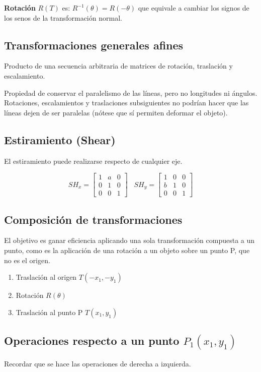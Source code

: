 \textbf{Rotación} $R(T)$ es: $R^{-1}(\theta) = R(-\theta)$ que equivale a cambiar los signos de los senos de la transformación normal.

\subsection{Transformaciones generales afines}
Producto de una secuencia arbitraria de matrices de rotación, traslación y escalamiento.

Propiedad de conservar el paralelismo de las líneas, pero no longitudes ni ángulos. Rotaciones, escalamientos y traslaciones subsiguientes no podrían hacer que las líneas dejen de ser paralelas (nótese que sí permiten deformar el objeto).

\subsection{Estiramiento (Shear)}
El estiramiento puede realizarse respecto de cualquier eje.

$$SH_x = \left[\begin{matrix}
			1 & a & 0 \\ 0 & 1 & 0 \\ 0 & 0 & 1
		\end{matrix}\right] \;\;\;
	SH_y = \left[\begin{matrix}
			1 & 0 & 0 \\ b & 1 & 0 \\ 0 & 0 & 1
		\end{matrix}\right]$$

\subsection{Composición de transformaciones}
El objetivo es ganar eficiencia aplicando una sola transformación compuesta a un punto, como es la aplicación de una rotación a un objeto sobre un punto P, que no es el origen.
\begin{enumerate}
	\item Traslación al origen $T(-x_1, -y_1)$
	\item Rotación $R(\theta)$
	\item Traslación al punto P $T(x_1, y_1)$
\end{enumerate}

\subsection{Operaciones respecto a un punto $P_1(x_1,y_1)$}
Recordar que se hace las operaciones de derecha a izquierda.

